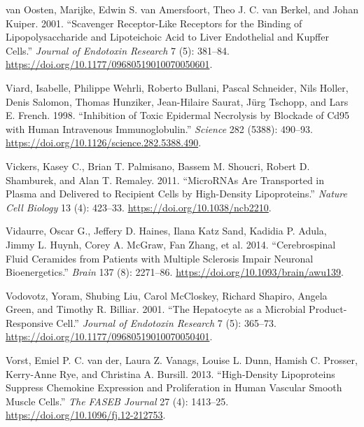 \documentclass[9pt,lineno]{elife}
\newlength{\cslhangindent}
\newlength{\cslentryspacingunit} %
\newenvironment{CSLReferences}[2] %
 {%
  \setlength{\parindent}{0pt}
  \ifodd #1
  \let\oldpar\par
  \def\par{\hangindent=\cslhangindent\oldpar}
  \fi
  \setlength{\parskip}{#2\cslentryspacingunit}
 }%
 {}
\begin{document}
\begin{landscape}
\begin{landscape}
\begin{landscape}
\begin{landscape}
\begin{CSLReferences}{1}{0}
\leavevmode{}%
van Oosten, Marijke, Edwin S. van Amersfoort, Theo J. C. van Berkel, and Johan Kuiper. 2001. {``Scavenger Receptor-Like Receptors for the Binding of Lipopolysaccharide and Lipoteichoic Acid to Liver Endothelial and {Kupffer} Cells.''} \emph{Journal of Endotoxin Research} 7 (5): 381--84. \url{https://doi.org/10.1177/09680519010070050601}.

\leavevmode{}%
Viard, Isabelle, Philippe Wehrli, Roberto Bullani, Pascal Schneider, Nils Holler, Denis Salomon, Thomas Hunziker, Jean-Hilaire Saurat, Jürg Tschopp, and Lars E. French. 1998. {``Inhibition of {Toxic Epidermal Necrolysis} by {Blockade} of {Cd95} with {Human Intravenous Immunoglobulin}.''} \emph{Science} 282 (5388): 490--93. \url{https://doi.org/10.1126/science.282.5388.490}.

\leavevmode{}%
Vickers, Kasey C., Brian T. Palmisano, Bassem M. Shoucri, Robert D. Shamburek, and Alan T. Remaley. 2011. {``{MicroRNAs} Are Transported in Plasma and Delivered to Recipient Cells by High-Density Lipoproteins.''} \emph{Nature Cell Biology} 13 (4): 423--33. \url{https://doi.org/10.1038/ncb2210}.

\leavevmode{}%
Vidaurre, Oscar G., Jeffery D. Haines, Ilana Katz Sand, Kadidia P. Adula, Jimmy L. Huynh, Corey A. McGraw, Fan Zhang, et al. 2014. {``Cerebrospinal Fluid Ceramides from Patients with Multiple Sclerosis Impair Neuronal Bioenergetics.''} \emph{Brain} 137 (8): 2271--86. \url{https://doi.org/10.1093/brain/awu139}.

\leavevmode{}%
Vodovotz, Yoram, Shubing Liu, Carol McCloskey, Richard Shapiro, Angela Green, and Timothy R. Billiar. 2001. {``The Hepatocyte as a Microbial Product-Responsive Cell.''} \emph{Journal of Endotoxin Research} 7 (5): 365--73. \url{https://doi.org/10.1177/09680519010070050401}.

\leavevmode{}%
Vorst, Emiel P. C. van der, Laura Z. Vanags, Louise L. Dunn, Hamish C. Prosser, Kerry-Anne Rye, and Christina A. Bursill. 2013. {``High-Density Lipoproteins Suppress Chemokine Expression and Proliferation in Human Vascular Smooth Muscle Cells.''} \emph{The FASEB Journal} 27 (4): 1413--25. \url{https://doi.org/10.1096/fj.12-212753}.


\end{CSLReferences}
\end{landscape}
\end{landscape}
\end{landscape}
\end{landscape}
\end{document}

